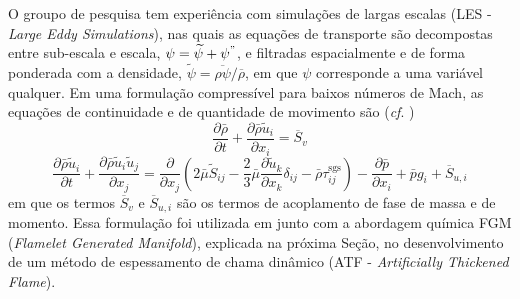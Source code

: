 O groupo de pesquisa tem experiência com simulações de largas escalas (LES - \emph{Large Eddy Simulations}), nas quais as equações de transporte são decompostas entre sub-escala e escala, $\psi = \widetilde\psi + \psi^"$, e filtradas espacialmente e de forma ponderada com a densidade, $\widetilde\psi = \overline{\rho\psi}/\overline\rho$, em que $\psi$ corresponde a uma variável qualquer. 
Em uma formulação compressível para baixos números de Mach, as equações de continuidade e de quantidade de movimento são (\emph{cf}. \cite{SacomanoF2017CF})
\begin{equation}
\frac{\partial \bar \rho}{\partial t} + 
\frac{\partial \bar \rho \widetilde u_i}{\partial x_i} = 
\overline S_v
\end{equation}
\begin{equation}
\frac{\partial \bar\rho \widetilde u_i}{\partial t} + 
\frac{\partial \bar\rho \widetilde u_i \widetilde u_j}{\partial x_j} =
\frac{\partial }{\partial x_j} \left(
	2\bar\mu \widetilde S_{ij} -
	\frac{2}{3}\bar\mu \frac{\partial \widetilde u_k}{\partial x_k} \delta_{ij} -
	\bar\rho \tau_{ij}^{\text{sgs}}
\right) -
\frac{\partial \bar p}{\partial x_i} +
\bar p g_i + 
\overline S_{u,i}
\end{equation}
em que os termos $\overline S_v$ e $\overline S_{u,i}$ são os termos de acoplamento de fase de massa e de momento.
Essa formulação foi utilizada em \cite{SacomanoF2017PhD, SacomanoF2017CF, SacomanoF2020CF} junto com a abordagem química FGM (\emph{Flamelet Generated Manifold}), explicada na próxima Seção, no desenvolvimento de um método de espessamento de chama dinâmico (ATF - \emph{Artificially Thickened Flame}).

